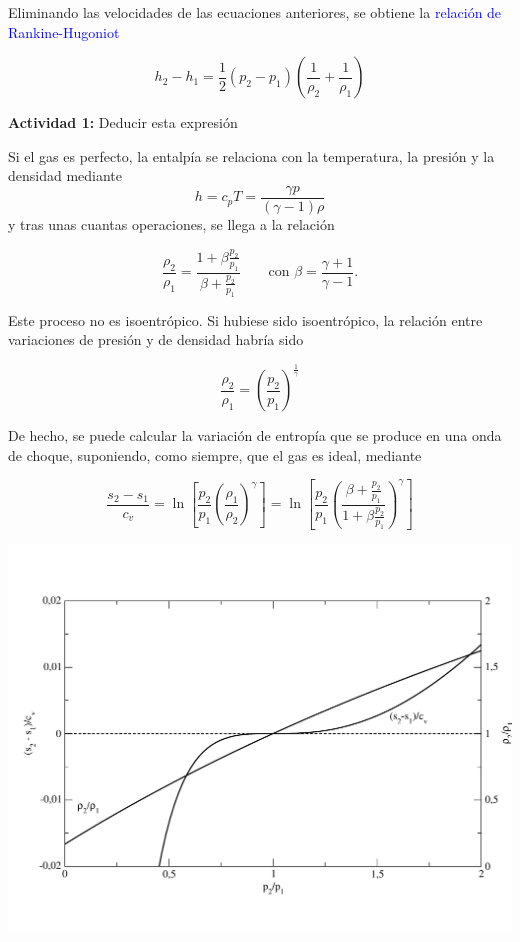 	
	Eliminando las velocidades de las ecuaciones anteriores, se obtiene
	la \textcolor{blue}{relación de Rankine-Hugoniot} 
	
\begin{equation}
		h_{2}-h_{1}=\frac{1}{2}\left(p_{2}-p_{1}\right)\left(\frac{1}{\rho_{2}}+\frac{1}{\rho_{1}}\right)
\end{equation}
	
	
	\textbf{Actividad 1:} Deducir esta expresión


	Si el gas es perfecto, la entalpía se relaciona con la temperatura,
	la presión y la densidad mediante 
	\[
	h=c_{p}T=\frac{\gamma p}{(\gamma-1)\rho}
	\]
	y tras unas cuantas operaciones, se llega a la relación 
	
\begin{equation}
		\frac{\rho_{2}}{\rho_{1}}=\frac{1+\beta\frac{p_{2}}{p_{1}}}{\beta+\frac{p_{2}}{p_{1}}}\qquad\text{con }\beta=\frac{\gamma+1}{\gamma-1}.
\end{equation}
	
	
	Este proceso no es isoentrópico. Si hubiese sido isoentrópico, la
	relación entre variaciones de presión y de densidad habría sido 
	
\begin{equation}
		\frac{\rho_{2}}{\rho_{1}}=\left(\frac{p_{2}}{p_{1}}\right)^{\frac{1}{\gamma}}
\end{equation}
	
	
	De hecho, se puede calcular la variación de entropía que se produce
	en una onda de choque, suponiendo, como siempre, que el gas es ideal,
	mediante 
	
\begin{equation}		\frac{s_{2}-s_{1}}{c_{v}}=\ln\left[\frac{p_{2}}{p_{1}}\left(\frac{\rho_{1}}{\rho_{2}}\right)^{\gamma}\right]=\ln\left[\frac{p_{2}}{p_{1}}\left(\frac{\beta+\frac{p_{2}}{p_{1}}}{1+\beta\frac{p_{2}}{p_{1}}}\right)^{\gamma}\right]
\end{equation}
	
	
	\includegraphics[clip,width=1\linewidth]{TeX_files/chapter11-Compresible/densidades}

